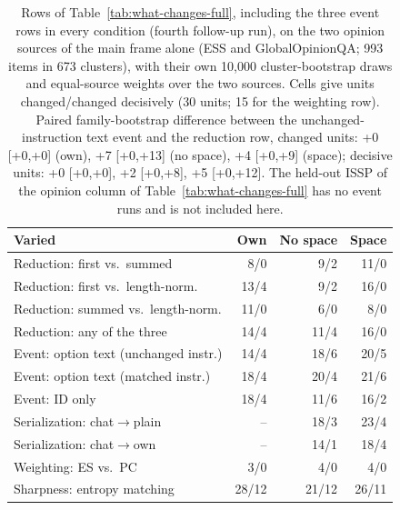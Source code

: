 \begin{table}[t]
\centering\scriptsize
\setlength{\tabcolsep}{4pt}
\begin{tabular}{@{}lrrr@{}}
\toprule
Varied & Own & No space & Space \\
\midrule
Reduction: first vs.\ summed & 8/0 & 9/2 & 11/0 \\
Reduction: first vs.\ length-norm. & 13/4 & 9/2 & 16/0 \\
Reduction: summed vs.\ length-norm. & 11/0 & 6/0 & 8/0 \\
Reduction: any of the three & 14/4 & 11/4 & 16/0 \\
Event: option text (unchanged instr.) & 14/4 & 18/6 & 20/5 \\
Event: option text (matched instr.) & 18/4 & 20/4 & 21/6 \\
Event: ID only & 18/4 & 11/6 & 16/2 \\
Serialization: chat$\to$plain & -- & 18/3 & 23/4 \\
Serialization: chat$\to$own & -- & 14/1 & 18/4 \\
Weighting: ES vs.\ PC & 3/0 & 4/0 & 4/0 \\
Sharpness: entropy matching & 28/12 & 21/12 & 26/11 \\
\bottomrule
\end{tabular}
\caption{Rows of Table~\ref{tab:what-changes-full}, including the three event rows in every condition (fourth follow-up run), on the two opinion sources of the main frame alone (ESS and GlobalOpinionQA; 993 items in 673 clusters), with their own 10,000 cluster-bootstrap draws and equal-source weights over the two sources. Cells give units changed/changed decisively (30 units; 15 for the weighting row). Paired family-bootstrap difference between the unchanged-instruction text event and the reduction row, changed units: +0 [+0,+0] (own), +7 [+0,+13] (no space), +4 [+0,+9] (space); decisive units: +0 [+0,+0], +2 [+0,+8], +5 [+0,+12]. The held-out ISSP of the opinion column of Table~\ref{tab:what-changes-full} has no event runs and is not included here.}
\label{tab:opinion-events}
\end{table}
